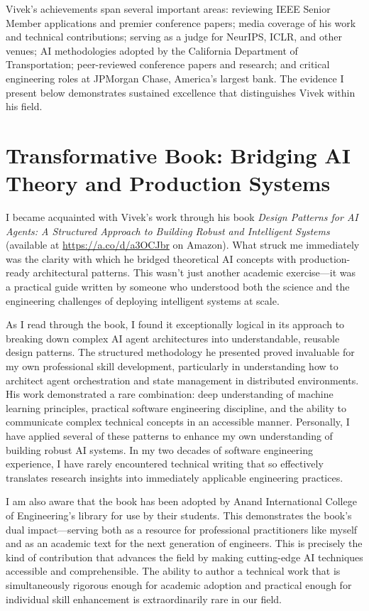 \documentclass[11pt]{article}
\begin{document}
Vivek's achievements span several important areas: reviewing IEEE Senior Member applications and premier conference papers; media coverage of his work and technical contributions; serving as a judge for NeurIPS, ICLR, and other venues; AI methodologies adopted by the California Department of Transportation; peer-reviewed conference papers and research; and critical engineering roles at JPMorgan Chase, America's largest bank. The evidence I present below demonstrates sustained excellence that distinguishes Vivek within his field.

\section*{Transformative Book: Bridging AI Theory and Production Systems}

I became acquainted with Vivek's work through his book \textit{Design Patterns for AI Agents: A Structured Approach to Building Robust and Intelligent Systems} (available at \url{https://a.co/d/a3OCJbr} on Amazon). What struck me immediately was the clarity with which he bridged theoretical AI concepts with production-ready architectural patterns. This wasn't just another academic exercise---it was a practical guide written by someone who understood both the science and the engineering challenges of deploying intelligent systems at scale.

As I read through the book, I found it exceptionally logical in its approach to breaking down complex AI agent architectures into understandable, reusable design patterns. The structured methodology he presented proved invaluable for my own professional skill development, particularly in understanding how to architect agent orchestration and state management in distributed environments. His work demonstrated a rare combination: deep understanding of machine learning principles, practical software engineering discipline, and the ability to communicate complex technical concepts in an accessible manner. Personally, I have applied several of these patterns to enhance my own understanding of building robust AI systems. In my two decades of software engineering experience, I have rarely encountered technical writing that so effectively translates research insights into immediately applicable engineering practices.

I am also aware that the book has been adopted by Anand International College of Engineering's library for use by their students. This demonstrates the book's dual impact---serving both as a resource for professional practitioners like myself and as an academic text for the next generation of engineers. This is precisely the kind of contribution that advances the field by making cutting-edge AI techniques accessible and comprehensible. The ability to author a technical work that is simultaneously rigorous enough for academic adoption and practical enough for individual skill enhancement is extraordinarily rare in our field.
\end{document}
